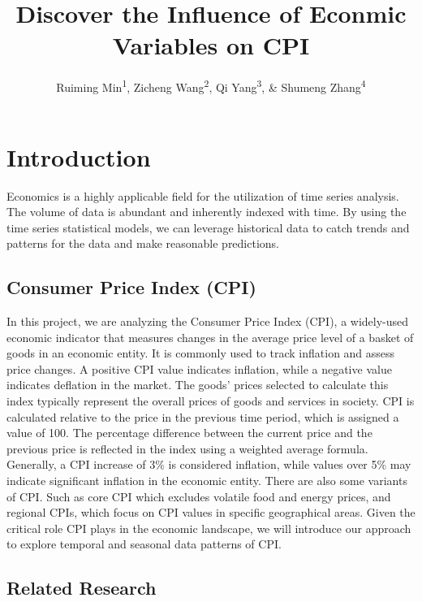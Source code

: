 \documentclass[
  man,floatsintext,
  man]{apa6}
\title{Discover the Influence of Econmic Variables on CPI}
\author{Ruiming Min\textsuperscript{1}, Zicheng Wang\textsuperscript{2}, Qi Yang\textsuperscript{3}, \& Shumeng Zhang\textsuperscript{4}}
\date{}
\affiliation{\vspace{0.5cm}\textsuperscript{5} UIUC}
\begin{document}
\maketitle

\hypertarget{introduction}{%
\section{Introduction}\label{introduction}}

Economics is a highly applicable field for the utilization of time series analysis. The volume of data is abundant and inherently indexed with time. By using the time series statistical models, we can leverage historical data to catch trends and patterns for the data and make reasonable predictions.

\hypertarget{consumer-price-index-cpi}{%
\subsection{Consumer Price Index (CPI)}\label{consumer-price-index-cpi}}

In this project, we are analyzing the Consumer Price Index (CPI), a widely-used economic indicator that measures changes in the average price level of a basket of goods in an economic entity. It is commonly used to track inflation and assess price changes. A positive CPI value indicates inflation, while a negative value indicates deflation in the market. The goods' prices selected to calculate this index typically represent the overall prices of goods and services in society.
CPI is calculated relative to the price in the previous time period, which is assigned a value of 100. The percentage difference between the current price and the previous price is reflected in the index using a weighted average formula. Generally, a CPI increase of 3\% is considered inflation, while values over 5\% may indicate significant inflation in the economic entity. There are also some variants of CPI. Such as core CPI which excludes volatile food and energy prices, and regional CPIs, which focus on CPI values in specific geographical areas.
Given the critical role CPI plays in the economic landscape, we will introduce our approach to explore temporal and seasonal data patterns of CPI.

\hypertarget{related-research}{%
\subsection{Related Research}\label{related-research}}
\end{document}
